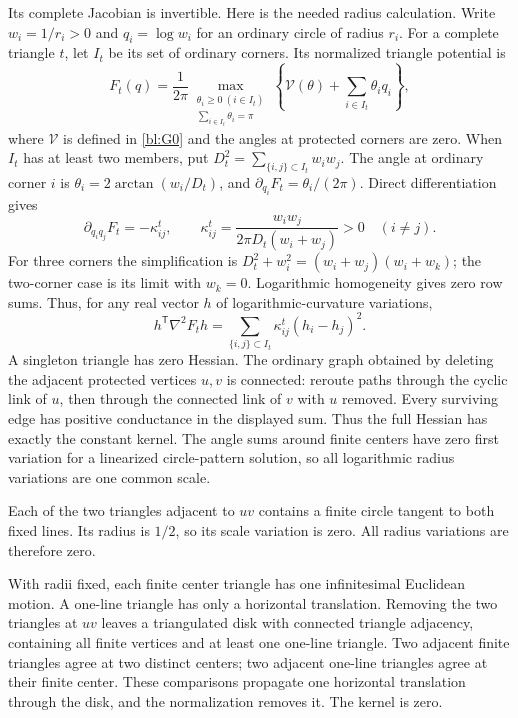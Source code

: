 Its complete Jacobian is invertible.\label{mcg:complete-radius-hessian}
Here is the needed radius calculation. Write \(w_i=1/r_i>0\)
and \(q_i=\log w_i\) for an ordinary circle of radius \(r_i\).
For a complete triangle \(t\), let \(I_t\) be its set of ordinary
corners. Its normalized triangle potential is
\[
 F_t(q)=\frac1{2\pi}\max_{\substack{\theta_i\ge0\ (i\in I_t)\\
                                  \sum_{i\in I_t}\theta_i=\pi}}
       \left\{\mathcal V(\theta)+\sum_{i\in I_t}\theta_iq_i\right\},
\]
where \(\mathcal V\) is defined in \eqref{bl:G0} and the angles
at protected corners are zero. When \(I_t\) has at least two
members, put \(D_t^2=\sum_{\{i,j\}\subset I_t}w_iw_j\).
The angle at ordinary corner \(i\) is
\(\theta_i=2\arctan(w_i/D_t)\), and
\(\partial_{q_i}F_t=\theta_i/(2\pi)\). Direct differentiation gives
\[
 \partial_{q_iq_j}F_t
  =-\kappa_{ij}^{t},\qquad
 \kappa_{ij}^{t}=\frac{w_iw_j}{2\pi D_t(w_i+w_j)}>0
 \quad(i\ne j).
\]
For three corners the simplification is
\(D_t^2+w_i^2=(w_i+w_j)(w_i+w_k)\); the two-corner case is its
limit with \(w_k=0\). Logarithmic homogeneity gives zero row sums.
Thus, for any real vector \(h\) of logarithmic-curvature variations,
\[
 h^{\mathsf T}\nabla^2F_t h
   =\sum_{\{i,j\}\subset I_t}\kappa_{ij}^{t}(h_i-h_j)^2.
\]
A singleton triangle has zero Hessian. The ordinary graph obtained
by deleting the adjacent protected vertices \(u,v\) is connected:
reroute paths through the cyclic link of \(u\), then through the
connected link of \(v\) with \(u\) removed. Every surviving edge has
positive conductance in the displayed sum. Thus the full Hessian
has exactly the constant kernel. The angle sums around finite
centers have zero first variation for a linearized circle-pattern
solution, so all logarithmic radius variations are one common scale.

Each of the two triangles
adjacent to \(uv\) contains a finite circle tangent to both fixed lines.
Its radius is \(1/2\), so its scale variation is zero. All radius
variations are therefore zero.

With radii fixed, each finite center triangle has one infinitesimal
Euclidean motion. A one-line triangle has only a horizontal translation.
Removing the two triangles at \(uv\) leaves a triangulated disk with
connected triangle adjacency, containing all finite vertices and at
least one one-line triangle. Two adjacent finite triangles agree at two
distinct centers; two adjacent one-line triangles agree at their finite
center. These comparisons propagate one horizontal translation through
the disk, and the normalization removes it. The kernel is zero.


